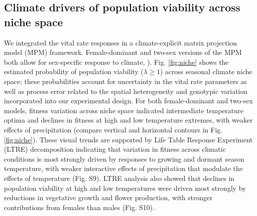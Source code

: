 \documentclass[9pt,twocolumn,twoside,lineno]{pnas-new}
\newcommand{\tom}[2]{{\color{red}{#1}}\footnote{\textit{\color{red}{#2}}}}
\newcommand{\revise}[1]{{\color{Mahogany}{#1}}}
\begin{document}
\subsection*{Climate drivers of population viability across niche space}
We integrated the vital rate responses in a climate-explicit matrix projection model (MPM) framework. 
Female-dominant and two-sex versions of the MPM  both allow for sex-specific response to climate, \revise{but only the two-sex model accounts for the feedback between OSR and seed fertilization (pollen limitation under female-biased sex ratios: Fig. S12}).
Fig. \ref{fig:niche} shows the estimated probability of population viability ($\lambda \ge 1$) across seasonal climate niche space; these probabilities account for uncertainty in the vital rate parameters as well as process error related to the spatial heterogeneity and genotypic variation incorporated into our experimental design. 
For both female-dominant and two-sex models, fitness variation across niche space indicated intermediate temperature optima and declines in fitness at high and low temperature extremes, with weaker effects of precipitation (compare vertical and horizontal contours in Fig. \ref{fig:niche}). 
 These visual trends are supported by Life Table Response Experiment (LTRE) decomposition indicating that variation in fitness across climatic conditions is most strongly driven by responses to growing and dormant season temperature, with weaker interactive effects of precipitation that modulate the effects of temperature (Fig. S9). 
LTRE analysis also showed that declines in population viability at high and low temperatures were driven most strongly by reductions in vegetative growth and flower production, with stronger contributions from females than males (Fig. S10).
\end{document}
